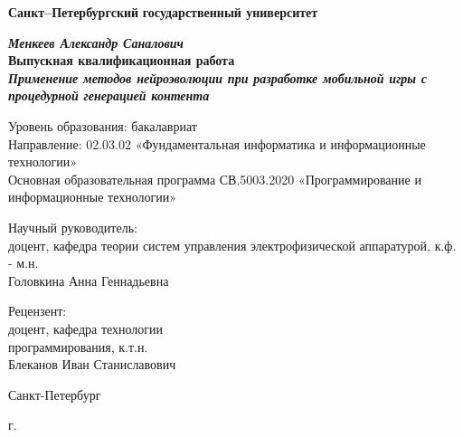 \begin{titlepage}
\begin{center}

\textbf{Санкт--Петербургский}
\textbf{государственный университет}

\vspace{35mm}

\textbf{\textit{\large Менкеев Александр Саналович}} \\[8mm]
\textbf{\large Выпускная квалификационная работа}\\[3mm]
\textbf{\textit{\large Применение методов нейроэволюции при разработке мобильной игры с процедурной генерацией контента}}

\vspace{20mm}
Уровень образования: бакалавриат\\
Направление: 02.03.02 «Фундаментальная информатика и информационные технологии»\\
Основная образовательная программа СВ.5003.2020 
«Программирование и информационные технологии»\\[10mm]


\begin{flushright}
\begin{minipage}[t]{0.56\textwidth}
{Научный руководитель:} \\
доцент, кафедра теории систем управления электрофизической аппаратурой, к.ф. - м.н.\\
Головкина Анна Геннадьевна

\vspace{6mm}

{Рецензент:} \\
доцент, кафедра технологии\\ программирования, к.т.н.\\ Блеканов Иван Станиславович
\end{minipage}
\end{flushright}

\vfill 

{Санкт-Петербург}
\par{\the\year{} г.}
\end{center}
\end{titlepage}
\restoregeometry
\addtocounter{page}{1}
